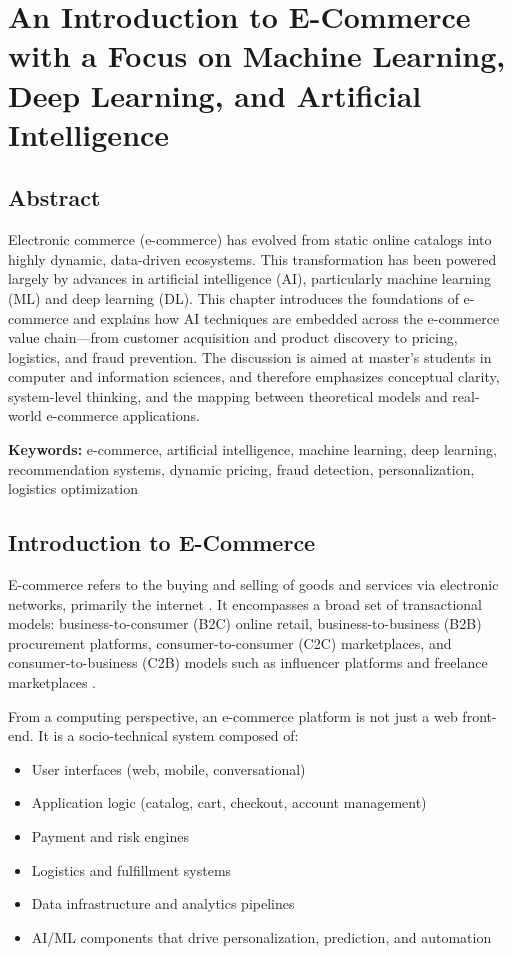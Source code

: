 \chapter[Introduction to AI-Driven E-Commerce]{An Introduction to E-Commerce with a Focus on Machine Learning, Deep Learning, and Artificial Intelligence}

\section*{Abstract}
Electronic commerce (e-commerce) has evolved from static online catalogs into highly dynamic, data-driven ecosystems.
This transformation has been powered largely by advances in artificial intelligence (AI), particularly machine learning (ML) and deep learning (DL).
This chapter introduces the foundations of e-commerce and explains how AI techniques are embedded across the e-commerce value chain---from customer acquisition and product discovery to pricing, logistics, and fraud prevention.
The discussion is aimed at master's students in computer and information sciences, and therefore emphasizes conceptual clarity, system-level thinking, and the mapping between theoretical models and real-world e-commerce applications.

\textbf{Keywords:} e-commerce, artificial intelligence, machine learning, deep learning, recommendation systems, dynamic pricing, fraud detection, personalization, logistics optimization

\section{Introduction to E-Commerce}
E-commerce refers to the buying and selling of goods and services via electronic networks, primarily the internet \citep{laudon2024ecommerce}.
It encompasses a broad set of transactional models: business-to-consumer (B2C) online retail, business-to-business (B2B) procurement platforms, consumer-to-consumer (C2C) marketplaces, and consumer-to-business (C2B) models such as influencer platforms and freelance marketplaces \citep{laudon2024ecommerce}.

From a computing perspective, an e-commerce platform is not just a web front-end.
It is a socio-technical system composed of:
\begin{itemize}
  \item User interfaces (web, mobile, conversational)
  \item Application logic (catalog, cart, checkout, account management)
  \item Payment and risk engines
  \item Logistics and fulfillment systems
  \item Data infrastructure and analytics pipelines
  \item AI/ML components that drive personalization, prediction, and automation
\end{itemize}

